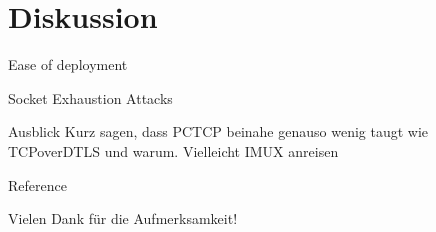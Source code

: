 \documentclass{beamer}
\begin{document}
\section{Diskussion}

\begin{frame}{Ease of deployment}
\end{frame}

\begin{frame}{Socket Exhaustion Attacks}
\end{frame}

\begin{frame}{Ausblick}
Kurz sagen, dass PCTCP beinahe genauso wenig taugt wie TCPoverDTLS und warum.
Vielleicht IMUX anreisen
\end{frame}




\begin{frame}[plain]{Reference}
  \begin{center}
  Vielen Dank für die Aufmerksamkeit!
  \end{center}
  \tiny
  
  
\end{frame}

\nocite{tor}
\nocite{tcp-over-dtls}
\nocite{pctcp}
\nocite{imux}
\nocite{tor_improvements}

\end{document}
